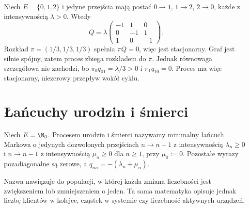 \begin{przyklad}
Niech $E=\{0,1,2\}$ i jedyne przejścia mają postać
$0\to1$, $1\to2$, $2\to0$, każde z intensywnością
$\lambda>0$. Wtedy
\[
Q=\lambda\begin{pmatrix}-1&1&0\\0&-1&1\\1&0&-1\end{pmatrix}.
\]
Rozkład $\pi=(1/3,1/3,1/3)$ spełnia $\pi Q=0$,
więc jest stacjonarny. Graf jest silnie spójny,
zatem proces zbiega rozkładem do $\pi$.
Jednak równowaga szczegółowa nie zachodzi, bo
$\pi_0q_{01}=\lambda/3>0$ i $\pi_1q_{10}=0$.
Proces ma więc stacjonarny, niezerowy przepływ wokół cyklu.
\end{przyklad}

\section{Łańcuchy urodzin i śmierci}
\begin{definicja}
Niech $E=\N_0$. Procesem urodzin i śmierci nazywamy
minimalny łańcuch Markowa o jedynych dozwolonych przejściach
$n\to n+1$ z intensywnością $\lambda_n\ge0$ i
$n\to n-1$ z intensywnością $\mu_n\ge0$ dla $n\ge1$,
przy $\mu_0:=0$. Pozostałe wyrazy pozadiagonalne są zerowe,
a $q_{nn}=-(\lambda_n+\mu_n)$.
\end{definicja}

Nazwa nawiązuje do populacji, w której każda zmiana liczebności
jest zwiększeniem lub zmniejszeniem o jeden. Ta sama
matematyka opisuje jednak liczbę klientów w kolejce, cząstek
w systemie czy liczebność aktywnych urządzeń.

